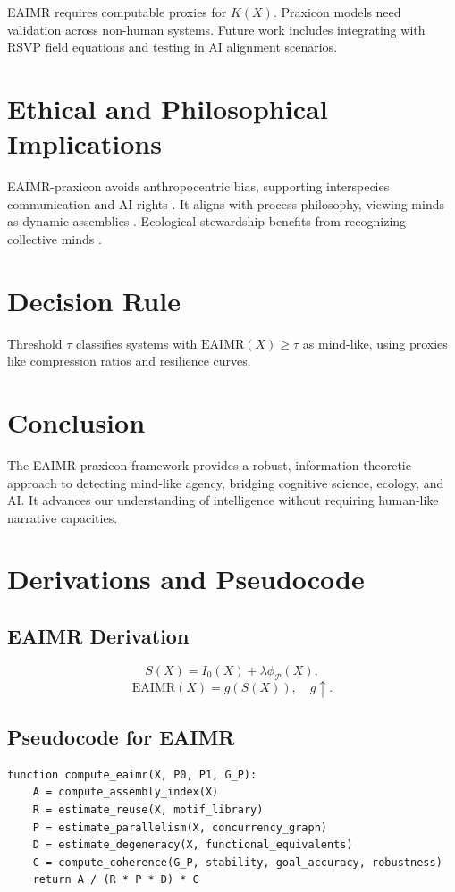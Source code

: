\documentclass{article}
\begin{document}
EAIMR requires computable proxies for \(K(X)\). Praxicon models need validation across non-human systems. Future work includes integrating with RSVP field equations and testing in AI alignment scenarios.

\section{Ethical and Philosophical Implications}
\label{sec:ethics}

EAIMR-praxicon avoids anthropocentric bias, supporting interspecies communication and AI rights \citep{dennett1987}. It aligns with process philosophy, viewing minds as dynamic assemblies \citep{whitehead1929}. Ecological stewardship benefits from recognizing collective minds \citep{simondon2017}.

\section{Decision Rule}
\label{sec:decision}

Threshold \(\tau\) classifies systems with \(\text{EAIMR}(X) \geq \tau\) as mind-like, using proxies like compression ratios and resilience curves.

\section{Conclusion}
\label{sec:conclusion}

The EAIMR-praxicon framework provides a robust, information-theoretic approach to detecting mind-like agency, bridging cognitive science, ecology, and AI. It advances our understanding of intelligence without requiring human-like narrative capacities.

\appendix

\section{Derivations and Pseudocode}
\label{app:derivations}

\subsection{EAIMR Derivation}
\[
S(X) = I_0(X) + \lambda \phi_{\mathcal{P}}(X),
\]
\[
\text{EAIMR}(X) = g(S(X)), \quad g \uparrow.
\]

\subsection{Pseudocode for EAIMR}
\begin{verbatim}
function compute_eaimr(X, P0, P1, G_P):
    A = compute_assembly_index(X)
    R = estimate_reuse(X, motif_library)
    P = estimate_parallelism(X, concurrency_graph)
    D = estimate_degeneracy(X, functional_equivalents)
    C = compute_coherence(G_P, stability, goal_accuracy, robustness)
    return A / (R * P * D) * C
\end{verbatim}



\end{document}
